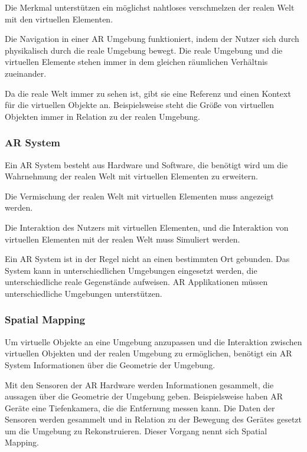Die Merkmal unterstützen ein möglichst nahtloses verschmelzen der realen Welt mit den virtuellen Elementen.

Die Navigation in einer AR Umgebung funktioniert, indem der Nutzer sich durch physikalisch durch die reale Umgebung bewegt. Die reale Umgebung und die virtuellen Elemente stehen immer in dem gleichen räumlichen Verhältnis zueinander.

Da die reale Welt immer zu sehen ist, gibt sie eine Referenz und einen Kontext für die virtuellen Objekte an. 
Beispielsweise steht die Größe von virtuellen Objekten immer in Relation zu der realen Umgebung.\citep{GrundlagenAR}


\subsubsection{AR System}

Ein AR System besteht aus Hardware und Software, die benötigt wird um die Wahrnehmung der realen Welt mit virtuellen Elementen zu erweitern.

Die Vermischung der realen Welt mit virtuellen Elementen muss angezeigt werden.

Die Interaktion des Nutzers mit virtuellen Elementen, und die Interaktion von virtuellen Elementen mit der realen Welt muss Simuliert werden.

Ein AR System ist in der Regel nicht an einen bestimmten Ort gebunden. Das System kann in unterschiedlichen Umgebungen eingesetzt werden, die unterschiedliche reale Gegenstände aufweisen. AR Applikationen müssen unterschiedliche Umgebungen unterstützen.\citep{GrundlagenAR}


\subsubsection{Spatial Mapping} 
Um virtuelle Objekte an eine Umgebung anzupassen und die Interaktion zwischen virtuellen Objekten und der realen Umgebung zu ermöglichen, benötigt ein AR System Informationen über die Geometrie der Umgebung.

Mit den Sensoren der AR Hardware werden Informationen gesammelt, die aussagen über die Geometrie der Umgebung geben. Beispielsweise haben AR Geräte eine Tiefenkamera, die die Entfernung messen kann. Die Daten der Sensoren werden gesammelt und in Relation zu der Bewegung des Gerätes gesetzt um die Umgebung zu Rekonstruieren. Dieser Vorgang nennt sich Spatial Mapping. 

